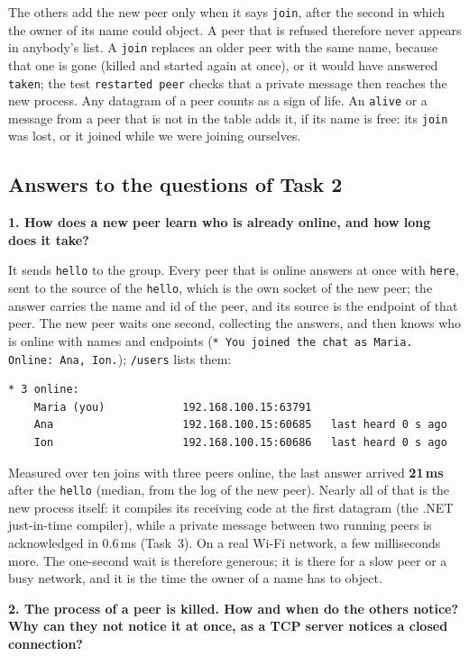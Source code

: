 \documentclass[11pt,a4paper]{article}
\newcommand{\question}[1]{\par\medskip\textbf{#1}\par}
\newcommand{\code}[1]{{\frenchspacing\texttt{#1}}}
\begin{document}
The others add the new peer only when it says \code{join}, after the second in which the owner of
its name could object. A peer that is refused therefore never appears in anybody's list. A
\code{join} replaces an older peer with the same name, because that one is gone (killed and
started again at once), or it would have answered \code{taken}; the test \code{restarted peer}
checks that a private message then reaches the new process. Any datagram of a peer counts as a sign
of life. An \code{alive} or a message from a peer that is not in the table adds it, if its name is
free: its \code{join} was lost, or it joined while we were joining ourselves.

\subsection{Answers to the questions of Task 2}

\question{1. How does a new peer learn who is already online, and how long does it take?}

It sends \code{hello} to the group. Every peer that is online answers at once with \code{here},
sent to the source of the \code{hello}, which is the own socket of the new peer; the answer carries
the name and id of the peer, and its source is the endpoint of that peer. The new peer waits one
second, collecting the answers, and then knows who is online with names and endpoints
(\code{* You joined the chat as Maria. Online: Ana, Ion.}); \code{/users} lists them:

\begin{lstlisting}
* 3 online:
    Maria (you)            192.168.100.15:63791
    Ana                    192.168.100.15:60685   last heard 0 s ago
    Ion                    192.168.100.15:60686   last heard 0 s ago
\end{lstlisting}

Measured over ten joins with three peers online, the last answer arrived \textbf{21\,ms} after the
\code{hello} (median, from the log of the new peer). Nearly all of that is the new process itself:
it compiles its receiving code at the first datagram (the .NET just-in-time compiler), while a
private message between two running peers is acknowledged in 0.6\,ms (Task~3). On a real Wi-Fi
network, a few milliseconds more. The one-second wait is therefore generous; it is there for a
slow peer or a busy network, and it is the time the owner of a name has to object.

\question{2. The process of a peer is killed. How and when do the others notice? Why can they not
notice it at once, as a TCP server notices a closed connection?}
\end{document}
